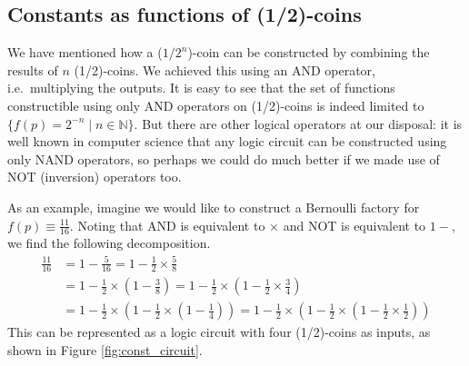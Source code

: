 \documentclass{article}
\theoremstyle{definition}
\newcommand{\AND}{{\footnotesize AND }}
\newcommand{\NOT}{{\footnotesize NOT }}
\begin{document}
\subsection{Constants as functions of (1/2)-coins}
We have mentioned how a ($1/2^{n}$)-coin can be constructed by combining the results of $n$ (1/2)-coins. We achieved this using an \AND operator, i.e.\ multiplying the outputs. It is easy to see that the set of functions constructible using only \AND operators on (1/2)-coins is indeed limited to $\{f(p)=2^{-n} \mid n\in\mathbb{N}\}$. But there are other logical operators at our disposal: it is well known in computer science that any logic circuit can be constructed using only {\footnotesize NAND} operators, so perhaps we could do much better if we made use of \NOT (inversion) operators too.

As an example, imagine we would like to construct a Bernoulli factory for $f(p)\equiv \frac{11}{16}$. Noting that \AND is equivalent to $\times$ and \NOT is equivalent to $1-$, we find the following decomposition.
\begin{align*}
\frac{11}{16} &= 1- \frac{5}{16} 
= 1 - \frac{1}{2} \times \frac{5}{8} \\
&= 1 - \frac{1}{2} \times \left(1 - \frac{3}{8}\right) 
= 1 - \frac{1}{2} \times \left(1 - \frac{1}{2} \times \frac{3}{4}\right) \\
&= 1 - \frac{1}{2} \times \left(1 - \frac{1}{2} \times \left(1-\frac{1}{4}\right)\right)
= 1 - \frac{1}{2} \times \left(1 - \frac{1}{2} \times \left(1-\frac{1}{2} \times \frac{1}{2}\right)\right)
\end{align*}
This can be represented as a logic circuit with four (1/2)-coins as inputs, as shown in Figure \ref{fig:const_circuit}.
\end{document}

